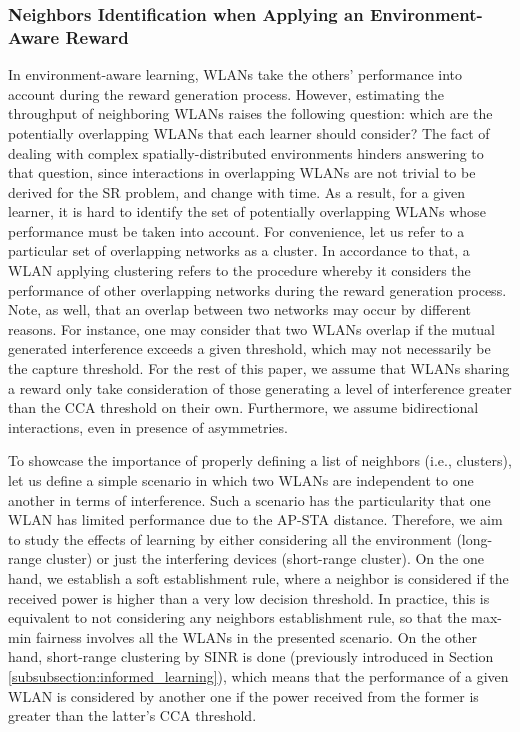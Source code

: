 \documentclass[preprint,12pt]{elsarticle}
\begin{document}
\subsubsection{Neighbors Identification when Applying an Environment-Aware Reward}
\label{subsubsection:clustering}
In environment-aware learning, WLANs take the others' performance into account during the reward generation process. However, estimating the throughput of neighboring WLANs raises the following question: which are the potentially overlapping WLANs that each learner should consider? The fact of dealing with complex spatially-distributed environments hinders answering to that question, since interactions in overlapping WLANs are not trivial to be derived for the SR problem, and change with time. As a result, for a given learner, it is hard to identify the set of potentially overlapping WLANs whose performance must be taken into account. For convenience, let us refer to a particular set of overlapping networks as a cluster. In accordance to that, a WLAN applying clustering refers to the procedure whereby it considers the performance of other overlapping networks during the reward generation process. Note, as well, that an overlap between two networks may occur by different reasons. For instance, one may consider that two WLANs overlap if the mutual generated interference exceeds a given threshold, which may not necessarily be the capture threshold. For the rest of this paper, we assume that WLANs sharing a reward only take consideration of those generating a level of interference greater than the CCA threshold on their own. Furthermore, we assume bidirectional interactions, even in presence of asymmetries.

To showcase the importance of properly defining a list of neighbors (i.e., clusters), let us define a simple scenario in which two WLANs are independent to one another in terms of interference. Such a scenario has the particularity that one WLAN has limited performance due to the AP-STA distance. Therefore, we aim to study the effects of learning by either considering all the environment (long-range cluster) or just the interfering devices (short-range cluster). On the one hand, we establish a soft establishment rule, where a neighbor is considered if the received power is higher than a very low decision threshold. In practice, this is equivalent to not considering any neighbors establishment rule, so that the max-min fairness involves all the WLANs in the presented scenario. On the other hand, short-range clustering by SINR is done (previously introduced in Section \ref{subsubsection:informed_learning}), which means that the performance of a given WLAN is considered by another one if the power received from the former is greater than the latter's CCA threshold.
\end{document}
